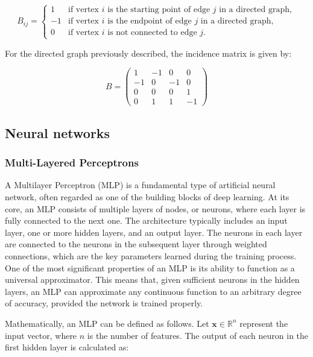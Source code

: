 \begin{equation}
 B_{ij} =
\begin{cases}
1 & \text{if vertex } i \text{ is the starting point of edge } j \text{ in a directed graph}, \\
-1 & \text{if vertex } i \text{ is the endpoint of edge } j \text{ in a directed graph}, \\
0 & \text{if vertex } i \text{ is not connected to edge } j.
\end{cases}  
    \label{eq:}
\end{equation}


For the directed graph previously described, the incidence matrix is given by:

\[
B = \begin{pmatrix}
1 & -1 & 0 & 0 \\
-1 & 0 & -1 & 0 \\
0 & 0 & 0 & 1  \\
0 & 1 & 1 & -1 
\end{pmatrix}
\]

\subsection{Neural networks}

\subsubsection{Multi-Layered Perceptrons}


A Multilayer Perceptron (MLP) is a fundamental type of artificial neural network, often regarded as one of the building blocks of deep learning. At its core, an MLP consists of multiple layers of nodes, or neurons, where each layer is fully connected to the next one. The architecture typically includes an input layer, one or more hidden layers, and an output layer. The neurons in each layer are connected to the neurons in the subsequent layer through weighted connections, which are the key parameters learned during the training process. One of the most significant properties of an MLP is its ability to function as a universal approximator. This means that, given sufficient neurons in the hidden layers, an MLP can approximate any continuous function to an arbitrary degree of accuracy, provided the network is trained properly.

Mathematically, an MLP can be defined as follows. Let $\mathbf{x} \in \mathbb{R}^n$ represent the input vector, where $n$ is the number of features. The output of each neuron in the first hidden layer is calculated as:

